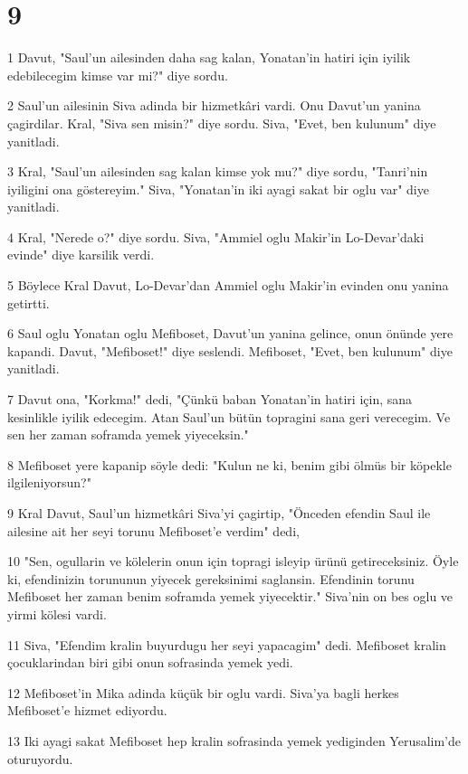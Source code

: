 \chapter{9}

\par 1 Davut, "Saul'un ailesinden daha sag kalan, Yonatan'in hatiri için iyilik edebilecegim kimse var mi?" diye sordu.
\par 2 Saul'un ailesinin Siva adinda bir hizmetkâri vardi. Onu Davut'un yanina çagirdilar. Kral, "Siva sen misin?" diye sordu. Siva, "Evet, ben kulunum" diye yanitladi.
\par 3 Kral, "Saul'un ailesinden sag kalan kimse yok mu?" diye sordu, "Tanri'nin iyiligini ona göstereyim." Siva, "Yonatan'in iki ayagi sakat bir oglu var" diye yanitladi.
\par 4 Kral, "Nerede o?" diye sordu. Siva, "Ammiel oglu Makir'in Lo-Devar'daki evinde" diye karsilik verdi.
\par 5 Böylece Kral Davut, Lo-Devar'dan Ammiel oglu Makir'in evinden onu yanina getirtti.
\par 6 Saul oglu Yonatan oglu Mefiboset, Davut'un yanina gelince, onun önünde yere kapandi. Davut, "Mefiboset!" diye seslendi. Mefiboset, "Evet, ben kulunum" diye yanitladi.
\par 7 Davut ona, "Korkma!" dedi, "Çünkü baban Yonatan'in hatiri için, sana kesinlikle iyilik edecegim. Atan Saul'un bütün topragini sana geri verecegim. Ve sen her zaman soframda yemek yiyeceksin."
\par 8 Mefiboset yere kapanip söyle dedi: "Kulun ne ki, benim gibi ölmüs bir köpekle ilgileniyorsun?"
\par 9 Kral Davut, Saul'un hizmetkâri Siva'yi çagirtip, "Önceden efendin Saul ile ailesine ait her seyi torunu Mefiboset'e verdim" dedi,
\par 10 "Sen, ogullarin ve kölelerin onun için topragi isleyip ürünü getireceksiniz. Öyle ki, efendinizin torununun yiyecek gereksinimi saglansin. Efendinin torunu Mefiboset her zaman benim soframda yemek yiyecektir." Siva'nin on bes oglu ve yirmi kölesi vardi.
\par 11 Siva, "Efendim kralin buyurdugu her seyi yapacagim" dedi. Mefiboset kralin çocuklarindan biri gibi onun sofrasinda yemek yedi.
\par 12 Mefiboset'in Mika adinda küçük bir oglu vardi. Siva'ya bagli herkes Mefiboset'e hizmet ediyordu.
\par 13 Iki ayagi sakat Mefiboset hep kralin sofrasinda yemek yediginden Yerusalim'de oturuyordu.

